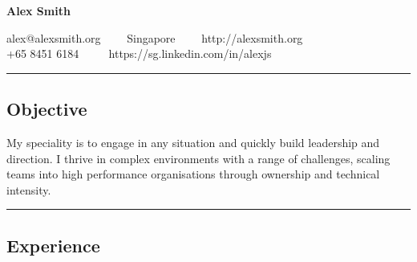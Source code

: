 \documentclass[10pt,a4paper]{article}
\begin{document}
\begin{center}
{\LARGE \textbf{Alex Smith}}


alex@alexsmith.org\ \ \textbullet
\ \ Singapore\ \ \textbullet
\ \ http://alexsmith.org
\\
+65 8451 6184 \ \ \textbullet
\ \ https://sg.linkedin.com/in/alexjs
\end{center}

\hrule
\vspace{-0.4em}
\subsection*{Objective}
    My speciality is to engage in any situation and quickly build leadership and direction. I thrive in complex environments with a range of challenges, scaling teams into high performance organisations through ownership and technical intensity.
    \\

\hrule
\vspace{-0.4em}
\subsection*{Experience}
\end{document}
